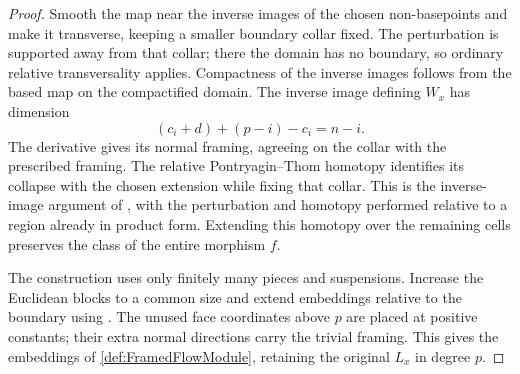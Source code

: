 \begin{proof}
    Smooth the map near the inverse images of the chosen non-basepoints and make it transverse, keeping a smaller boundary collar fixed. The perturbation is supported away from that collar; there the domain has no boundary, so ordinary relative transversality applies. Compactness of the inverse images follows from the based map on the compactified domain. The inverse image defining $W_x$ has dimension
    \[
        (c_i+d)+(p-i)-c_i=n-i.
    \]
    The derivative gives its normal framing, agreeing on the collar with the prescribed framing. The relative Pontryagin--Thom homotopy identifies its collapse with the chosen extension while fixing that collar. This is the inverse-image argument of \cite[Theorem~3.17 and Section~9]{Genauer12}, with the perturbation and homotopy performed relative to a region already in product form. Extending this homotopy over the remaining cells preserves the class of the entire morphism $f$.

    The construction uses only finitely many pieces and suspensions. Increase the Euclidean blocks to a common size and extend embeddings relative to the boundary using \cite[Proposition~2.8]{Genauer12}. The unused face coordinates above $p$ are placed at positive constants; their extra normal directions carry the trivial framing. This gives the embeddings of \cref{def:FramedFlowModule}, retaining the original $L_x$ in degree $p$.
\end{proof}

